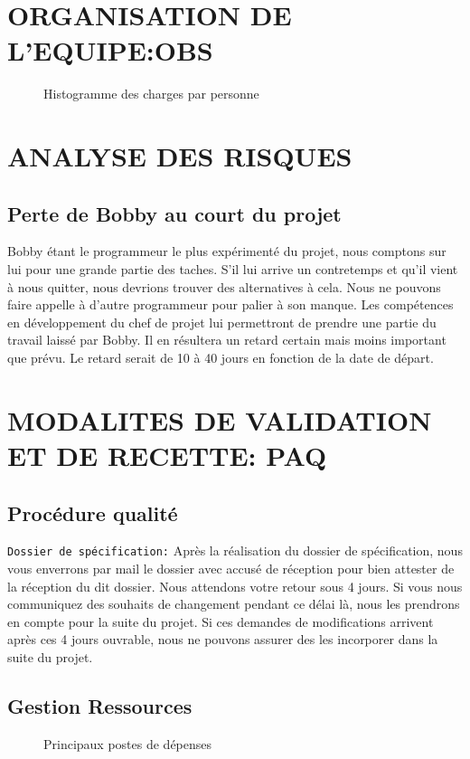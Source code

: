 \documentclass[]{scrartcl}
\begin{document}
\section{ORGANISATION DE L'EQUIPE:OBS}
\begin{figure}[H]
\caption{Histogramme des charges par personne}
\end{figure}

\section{ANALYSE DES RISQUES}
\subsection{Perte de Bobby au court du projet}
Bobby étant le programmeur le plus expérimenté du projet, nous comptons sur lui pour une grande partie des taches. S’il lui arrive un contretemps et qu’il vient à nous quitter, nous devrions trouver des alternatives à cela. Nous ne pouvons faire appelle à d’autre programmeur pour palier à son manque. Les compétences en développement du chef de projet lui permettront de prendre une partie du travail laissé par Bobby. Il en résultera un retard certain mais moins important que prévu. Le retard serait de 10 à 40 jours en fonction de la date de départ.
\section{MODALITES DE VALIDATION ET DE RECETTE: PAQ}
\subsection{Procédure qualité}
\texttt{Dossier de spécification:} Après la réalisation du dossier de spécification, nous vous enverrons par mail le dossier avec accusé de réception pour bien attester de la réception du dit dossier. Nous attendons votre retour sous  4 jours. Si vous nous communiquez des souhaits de changement pendant ce délai là, nous les prendrons en compte pour la suite du projet. Si ces demandes de modifications arrivent après ces 4 jours ouvrable, nous ne pouvons assurer des les incorporer dans la suite du projet.
\subsection{Gestion Ressources}
\begin{center}
\begin{figure}[H]
\caption{Principaux postes de dépenses}
\end{figure}
\end{center}

\begin{appendices}
\end{appendices}
\end{document}
